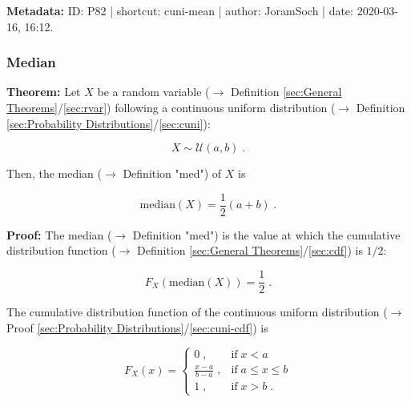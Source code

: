 \documentclass[a4paper,12pt,twoside]{book}
\begin{document}
\vspace{1em}
\textbf{Metadata:} ID: P82 | shortcut: cuni-mean | author: JoramSoch | date: 2020-03-16, 16:12.
\vspace{1em}



\subsubsection[\textbf{Median}]{Median} \label{sec:cuni-med}
\setcounter{equation}{0}

\textbf{Theorem:} Let $X$ be a random variable ($\rightarrow$ Definition \ref{sec:General Theorems}/\ref{sec:rvar}) following a continuous uniform distribution ($\rightarrow$ Definition \ref{sec:Probability Distributions}/\ref{sec:cuni}):

\begin{equation} \label{eq:cuni-med-cuni}
X \sim \mathcal{U}(a, b) \; .
\end{equation}

Then, the median ($\rightarrow$ Definition "med") of $X$ is

\begin{equation} \label{eq:cuni-med-cuni-med}
\mathrm{median}(X) = \frac{1}{2} (a+b) \; .
\end{equation}


\vspace{1em}
\textbf{Proof:} The median ($\rightarrow$ Definition "med") is the value at which the cumulative distribution function ($\rightarrow$ Definition \ref{sec:General Theorems}/\ref{sec:cdf}) is $1/2$:

\begin{equation} \label{eq:cuni-med-median}
F_X(\mathrm{median}(X)) = \frac{1}{2} \; .
\end{equation}

The cumulative distribution function of the continuous uniform distribution ($\rightarrow$ Proof \ref{sec:Probability Distributions}/\ref{sec:cuni-cdf}) is

\begin{equation} \label{eq:cuni-med-cuni-cdf}
F_X(x) = \left\{
\begin{array}{rl}
0 \; , & \text{if} \; x < a \\
\frac{x-a}{b-a} \; , & \text{if} \; a \leq x \leq b \\
1 \; , & \text{if} \; x > b \; .
\end{array}
\right.
\end{equation}
\end{document}
